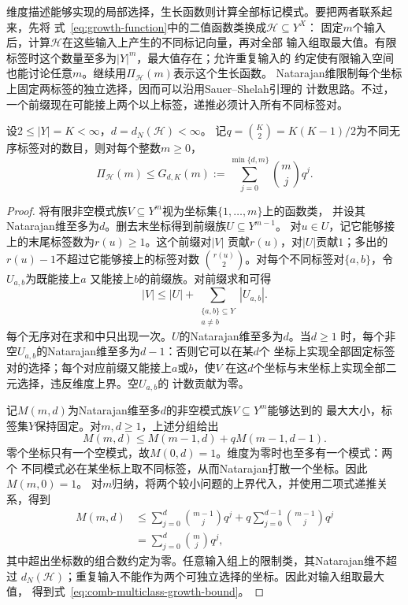维度描述能够实现的局部选择，生长函数则计算全部标记模式。要把两者联系起来，先将
式~\eqref{eq:growth-function}中的二值函数类换成\(\mathcal H\subseteq Y^X\)：
固定\(m\)个输入后，计算\(\mathcal H\)在这些输入上产生的不同标记向量，再对全部
输入组取最大值。有限标签时这个数量至多为\(|Y|^m\)，最大值存在；允许重复输入的
约定使有限输入空间也能讨论任意\(m\)。继续用\(\Pi_{\mathcal H}(m)\)表示这个生长函数。
Natarajan维限制每个坐标上固定两标签的独立选择，因而可以沿用Sauer--Shelah引理的
计数思路。不过，一个前缀现在可能接上两个以上标签，递推必须计入所有不同标签对。

\begin{theorem}[有限标签的预测数目上界]
\label{thm:multiclass-growth-bound}
设\(2\leq |Y|=K<\infty\)，\(d=d_N(\mathcal H)<\infty\)。
记\(q=\binom K2=K(K-1)/2\)为不同无序标签对的数目，则对每个整数\(m\geq0\)，
\begin{equation}
  \Pi_{\mathcal H}(m)\leq G_{d,K}(m)
  :=\sum_{j=0}^{\min\{d,m\}}\binom mj q^j.
  \label{eq:comb-multiclass-growth-bound}
\end{equation}
\end{theorem}

\begin{proof}
将有限非空模式族\(V\subseteq Y^m\)视为坐标集\(\{1,\ldots,m\}\)上的函数类，
并设其Natarajan维至多为\(d\)。删去末坐标得到前缀族\(U\subseteq Y^{m-1}\)。
对\(u\in U\)，记它能够接上的末尾标签数为\(r(u)\geq1\)。这个前缀对\(|V|\)
贡献\(r(u)\)，对\(|U|\)贡献\(1\)；多出的\(r(u)-1\)不超过它能够接上的标签对数
\(\binom{r(u)}2\)。对每个不同标签对\(\{a,b\}\)，令\(U_{a,b}\)为既能接上\(a\)
又能接上\(b\)的前缀族。对前缀求和可得
\[
  |V|\leq |U|+\sum_{\substack{\{a,b\}\subseteq Y\\a\neq b}}|U_{a,b}|.
\]
每个无序对在求和中只出现一次。\(U\)的Natarajan维至多为\(d\)。当\(d\geq1\)
时，每个非空\(U_{a,b}\)的Natarajan维至多为\(d-1\)：否则它可以在某\(d\)个
坐标上实现全部固定标签对的选择；每个对应前缀又能接上\(a\)或\(b\)，使\(V\)
在这\(d\)个坐标与末坐标上实现全部二元选择，违反维度上界。空\(U_{a,b}\)的
计数贡献为零。

记\(M(m,d)\)为Natarajan维至多\(d\)的非空模式族\(V\subseteq Y^m\)能够达到的
最大大小，标签集\(Y\)保持固定。对\(m,d\geq1\)，上述分组给出
\[
  M(m,d)\leq M(m-1,d)+qM(m-1,d-1).
\]
零个坐标只有一个空模式，故\(M(0,d)=1\)。维度为零时也至多有一个模式：两个
不同模式必在某坐标上取不同标签，从而Natarajan打散一个坐标。因此\(M(m,0)=1\)。
对\(m\)归纳，将两个较小问题的上界代入，并使用二项式递推关系，得到
\[
\begin{aligned}
  M(m,d)
  &\leq\sum_{j=0}^{d}\binom{m-1}{j}q^j
       +q\sum_{j=0}^{d-1}\binom{m-1}{j}q^j\\
  &=\sum_{j=0}^{d}\binom mj q^j,
\end{aligned}
\]
其中超出坐标数的组合数约定为零。任意输入组上的限制类，其Natarajan维不超过
\(d_N(\mathcal H)\)；重复输入不能作为两个可独立选择的坐标。因此对输入组取最大值，
得到式~\eqref{eq:comb-multiclass-growth-bound}。
\end{proof}

